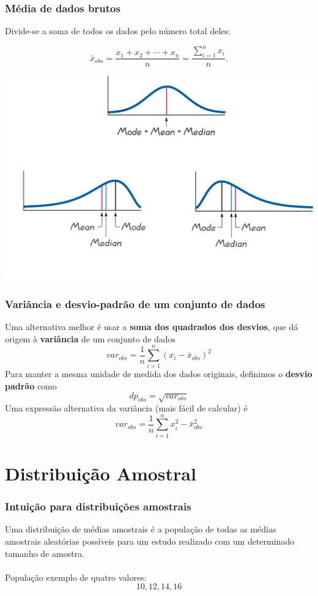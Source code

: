 \documentclass[11pt]{beamer}
\begin{document}
\begin{frame}
\frametitle{Média de dados brutos}

Divide-se a soma de todos os dados pelo número total deles:

\[
\bar{x}_{obs} = \frac{x_1 + x_2 + \cdots + x_n}{n} = \frac{\sum_{i=1}^n
x_i}{n}.
\]
\begin{center}\includegraphics[width=0.8\linewidth]{figs/medidas-crop} \end{center}
\end{frame}

\begin{frame}
\frametitle{Variância e desvio-padrão de um conjunto de dados}

Uma alternativa melhor é usar a \textbf{soma dos quadrados dos desvios},
que dá origem à \textbf{variância} de um conjunto de dados \[
var_{obs} = \frac{1}{n}\sum_{i=1}^n (x_i - \bar{x}_{obs})^2
\] Para manter a mesma unidade de medida dos dados originais, definimos
o \textbf{desvio padrão} como \[
dp_{obs} = \sqrt{var_{obs}}
\] Uma expressão alternativa da variância (mais fácil de calcular) é \[
var_{obs} = \frac{1}{n}\sum_{i=1}^n x_i^2 - \bar{x}_{obs}^2
\]
\end{frame}


\section{Distribuição Amostral}
\begin{frame}
\frametitle{Intuição para distribuições amostrais}
Uma distribuição de médias amostrais é a população de todas as médias amostrais aleatórias possíveis para um estudo realizado com um determinado tamanho de amostra.\\~\\
População exemplo de quatro valores: \[10, 12, 14, 16\]

\end{frame}
\end{document}
